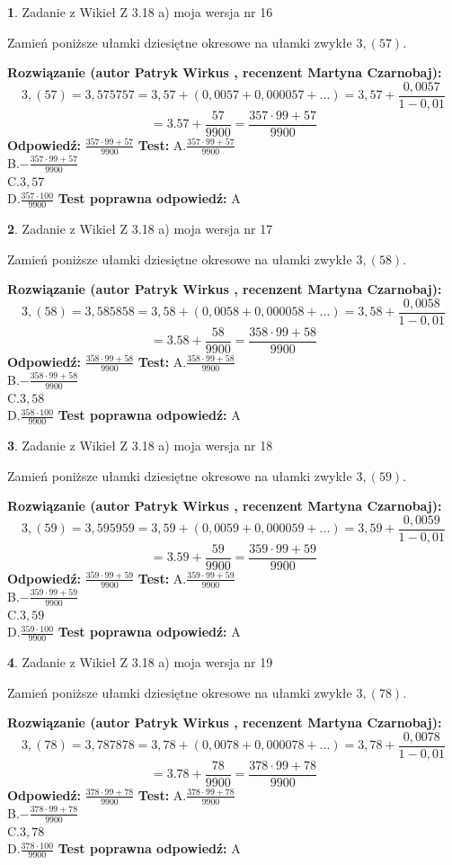 \documentclass[12pt, a4paper]{article}
\theoremstyle{definition} %
\newtheorem{zad}{}
\newcommand{\zadStart}[1]{\begin{zad}#1\newline}
\newcommand{\zadStop}{\end{zad}}
\newcommand{\rozwStart}[2]{\noindent \textbf{Rozwiązanie (autor #1 , recenzent #2): }\newline}
\newcommand{\rozwStop}{\newline}
\newcommand{\odpStart}{\noindent \textbf{Odpowiedź:}\newline}
\newcommand{\odpStop}{\newline}
\newcommand{\testStart}{\noindent \textbf{Test:}\newline}
\newcommand{\testStop}{\newline}
\newcommand{\kluczStart}{\noindent \textbf{Test poprawna odpowiedź:}\newline}
\newcommand{\kluczStop}{\newline}
\begin{document}
\zadStart{Zadanie z Wikieł Z 3.18 a) moja wersja nr 16}

Zamień poniższe ułamki dziesiętne okresowe na ułamki zwykłe $3,(57)$.
\zadStop
\rozwStart{Patryk Wirkus}{Martyna Czarnobaj}
$$3,(57)=3,575757=3,57+(0,0057+0,000057+...)=3,57+\frac{0,0057}{1-0,01}$$
$$=3.57+\frac{57}{9900}=\frac{357\cdot99+57}{9900}$$
\rozwStop
\odpStart
$\frac{357\cdot99+57}{9900}$
\odpStop
\testStart
A.$\frac{357\cdot99+57}{9900}$\\ B.$-\frac{357\cdot99+57}{9900}$\\ C.$3,57$\\ D.$\frac{357\cdot100}{9900}$
\testStop
\kluczStart
A
\kluczStop



\zadStart{Zadanie z Wikieł Z 3.18 a) moja wersja nr 17}

Zamień poniższe ułamki dziesiętne okresowe na ułamki zwykłe $3,(58)$.
\zadStop
\rozwStart{Patryk Wirkus}{Martyna Czarnobaj}
$$3,(58)=3,585858=3,58+(0,0058+0,000058+...)=3,58+\frac{0,0058}{1-0,01}$$
$$=3.58+\frac{58}{9900}=\frac{358\cdot99+58}{9900}$$
\rozwStop
\odpStart
$\frac{358\cdot99+58}{9900}$
\odpStop
\testStart
A.$\frac{358\cdot99+58}{9900}$\\ B.$-\frac{358\cdot99+58}{9900}$\\ C.$3,58$\\ D.$\frac{358\cdot100}{9900}$
\testStop
\kluczStart
A
\kluczStop



\zadStart{Zadanie z Wikieł Z 3.18 a) moja wersja nr 18}

Zamień poniższe ułamki dziesiętne okresowe na ułamki zwykłe $3,(59)$.
\zadStop
\rozwStart{Patryk Wirkus}{Martyna Czarnobaj}
$$3,(59)=3,595959=3,59+(0,0059+0,000059+...)=3,59+\frac{0,0059}{1-0,01}$$
$$=3.59+\frac{59}{9900}=\frac{359\cdot99+59}{9900}$$
\rozwStop
\odpStart
$\frac{359\cdot99+59}{9900}$
\odpStop
\testStart
A.$\frac{359\cdot99+59}{9900}$\\ B.$-\frac{359\cdot99+59}{9900}$\\ C.$3,59$\\ D.$\frac{359\cdot100}{9900}$
\testStop
\kluczStart
A
\kluczStop



\zadStart{Zadanie z Wikieł Z 3.18 a) moja wersja nr 19}

Zamień poniższe ułamki dziesiętne okresowe na ułamki zwykłe $3,(78)$.
\zadStop
\rozwStart{Patryk Wirkus}{Martyna Czarnobaj}
$$3,(78)=3,787878=3,78+(0,0078+0,000078+...)=3,78+\frac{0,0078}{1-0,01}$$
$$=3.78+\frac{78}{9900}=\frac{378\cdot99+78}{9900}$$
\rozwStop
\odpStart
$\frac{378\cdot99+78}{9900}$
\odpStop
\testStart
A.$\frac{378\cdot99+78}{9900}$\\ B.$-\frac{378\cdot99+78}{9900}$\\ C.$3,78$\\ D.$\frac{378\cdot100}{9900}$
\testStop
\kluczStart
A
\kluczStop
\end{document}
